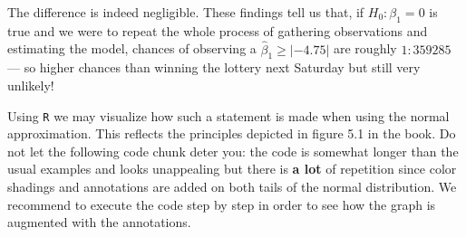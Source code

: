 \documentclass[]{book}
\theoremstyle{definition}
\theoremstyle{definition}
\theoremstyle{definition}
\theoremstyle{remark}
\begin{document}
The difference is indeed negligible. These findings tell us that, if
\(H_0: \beta_1 = 0\) is true and we were to repeat the whole process of
gathering observations and estimating the model, chances of observing a
\(\hat\beta_1 \geq |-4.75|\) are roughly \(1:359285\) --- so higher
chances than winning the lottery next Saturday but still very unlikely!

Using \texttt{R} we may visualize how such a statement is made when
using the normal approximation. This reflects the principles depicted in
figure 5.1 in the book. Do not let the following code chunk deter you:
the code is somewhat longer than the usual examples and looks
unappealing but there is \textbf{a lot} of repetition since color
shadings and annotations are added on both tails of the normal
distribution. We recommend to execute the code step by step in order to
see how the graph is augmented with the annotations.
\end{document}
